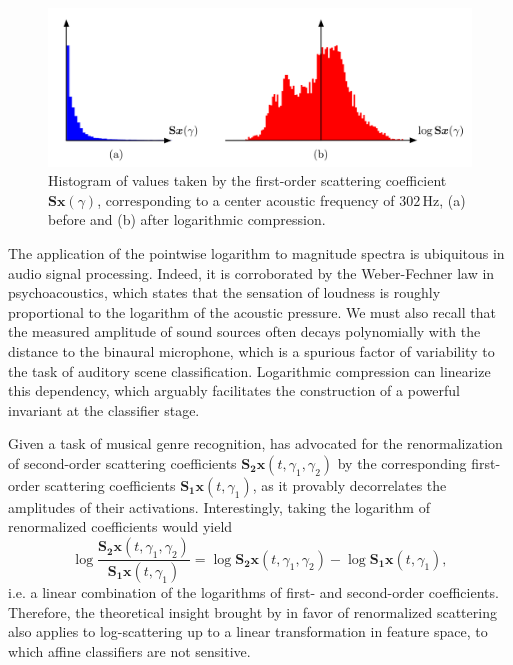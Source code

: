 \documentclass[journal]{IEEEtran}
\makeatletter
\newcommand*{\ie}{i.e.\@\xspace}
\makeatother
\begin{document}
\begin{figure}
\begin{center}
\includegraphics[width=\columnwidth]{compression.png}
\caption{
\label{fig:histograms}
Histogram of values taken by the first-order scattering coefficient $\mathbf{S}\boldsymbol{x}(\gamma)$, corresponding to a center acoustic frequency of $302\,\mathrm{Hz}$,
(a) before and (b) after logarithmic compression.}
\end{center}
\end{figure}


The application of the pointwise logarithm to magnitude spectra is ubiquitous in audio signal processing.
Indeed, it is corroborated by the Weber-Fechner law in psychoacoustics, which states that the sensation of loudness is roughly proportional to the logarithm of the acoustic pressure.
We must also recall that the measured amplitude of sound sources often decays polynomially with the distance to the binaural microphone, which is a spurious factor of variability to the task of auditory scene classification.
Logarithmic compression can linearize this dependency, which arguably facilitates the construction of a powerful invariant at the classifier stage.

Given a task of musical genre recognition, \cite{Anden2014} has advocated for the renormalization of second-order scattering coefficients $\mathbf{S_2}\boldsymbol{x}(t,\gamma_1,\gamma_2)$ by the corresponding first-order scattering coefficients $\mathbf{S_1}\boldsymbol{x}(t,\gamma_1)$, as it provably decorrelates the amplitudes of their activations.
Interestingly, taking the logarithm of renormalized coefficients would yield
\begin{equation}
\log \dfrac{\mathbf{S_2}\boldsymbol{x}(t,\gamma_1,\gamma_2)}{\mathbf{S_1}\boldsymbol{x}(t,\gamma_1)} =
\log \mathbf{S_2}\boldsymbol{x}(t, \gamma_1, \gamma_2) -
\log \mathbf{S_1}\boldsymbol{x}(t, \gamma_1),
\end{equation}
\ie a linear combination of the logarithms of first- and second-order coefficients.
Therefore, the theoretical insight brought by \cite{Anden2014} in favor of renormalized scattering also applies to log-scattering up to a linear transformation in feature space, to which affine classifiers are not sensitive.
\end{document}
